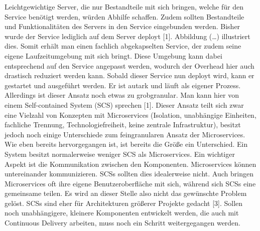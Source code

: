 Leichtgewichtige Server, die nur Bestandteile mit sich bringen, welche für den Service benötigt werden, würden Abhilfe schaffen. Zudem sollten Bestandteile und Funktionalitäten des Servers in den Service eingebunden werden. Bisher wurde der Service lediglich auf dem Server deployt [1]. Abbildung (…) illustriert dies. Somit erhält man einen fachlich abgekapselten Service, der zudem seine eigene Laufzeitumgebung mit sich bringt. Diese Umgebung kann dabei entsprechend auf den Service angepasst werden, wodurch der Overhead hier auch drastisch reduziert werden kann. Sobald dieser Service nun deployt wird, kann er gestartet und ausgeführt werden. Er ist autark und läuft als eigener Prozess. Allerdings ist dieser Ansatz noch etwas zu grobgranular. Man kann hier von einem Self-contained System (SCS) sprechen [1]. Dieser Ansatz teilt sich zwar eine Vielzahl von Konzepten mit Microservices (Isolation, unabhängige Einheiten, fachliche Trennung, Technologiefreiheit, keine zentrale Infrastruktur), besitzt jedoch noch einige Unterschiede zum feingranularen Ansatz der Microservices. Wie eben bereits hervorgegangen ist, ist bereits die Größe ein Unterschied. Ein System besitzt normalerweise weniger SCS als Microservices. Ein wichtiger Aspekt ist die Kommunikation zwischen den Komponenten. Microservices können untereinander kommunizieren. SCSs sollten dies idealerweise nicht. Auch bringen Microservices oft ihre eigene Benutzeroberfläche mit sich, während sich SCSs eine gemeinsame teilen. Es wird an dieser Stelle also nicht das gewünschte Problem gelöst. SCSs sind eher für Architekturen größerer Projekte gedacht [3]. Sollen noch unabhängigere, kleinere Komponenten entwickelt werden, die auch mit Continuous Delivery arbeiten, muss noch ein Schritt weitergegangen werden. 
